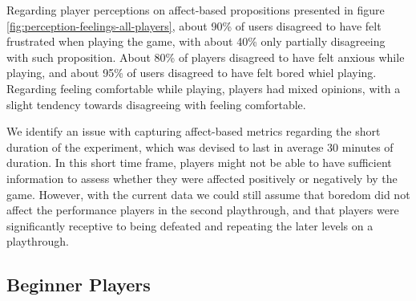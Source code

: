 Regarding player perceptions on affect-based propositions presented in figure \ref{fig:perception-feelings-all-players}, about 90\% of users disagreed to have felt frustrated when playing the game, with about 40\% only partially disagreeing with such proposition. About 80\% of players disagreed to have felt anxious while playing, and about 95\% of users disagreed to have felt bored whiel playing. Regarding feeling comfortable while playing, players had mixed opinions, with a slight tendency towards disagreeing with feeling comfortable.

We identify an issue with capturing affect-based metrics regarding the short duration of the experiment, which was devised to last in average 30 minutes of duration. In this short time frame, players might not be able to have sufficient information to assess whether they were affected positively or negatively by the game. However, with the current data we could still assume that boredom did not affect the performance players in the second playthrough, and that players were significantly receptive to being defeated and repeating the later levels on a playthrough.


\subsection{Beginner Players}



